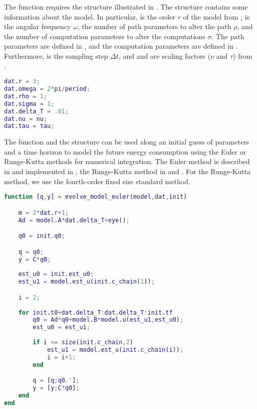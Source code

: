The function requires the structure  illustrated in . The structure contains some information about the model. In particular,  is the order $r$ of the model from ,  is the angular frequency $\omega$,  the number of path parameters to alter the path $\rho$, and  the number of computation parameters to alter the computations $\sigma$. The path parameters are defined in , and the computation parameters are defined in . Furthermore,  is the sampling step $\Delta t$, and  and  are scaling factors ($\nu$ and $\tau$) from .

\begin{lstlisting}[language=Matlab,caption={[Struct used to build the model]Struct \stt{dat} used by function \stt{build\_model} to build the model.},captionpos=b,label=lst:struct_dat]
dat.r = 3;
dat.omega = 2*pi/period;
dat.rho = 1;
dat.sigma = 1;
dat.delta_T = .01;
dat.nu = nu;
dat.tau = tau;
\end{lstlisting}

The function  and the structure  can be used along an initial guess of parameters and a time horizon to model the future energy consumption using the Euler or Runge-Kutta methods for numerical integration. The Euler method is described in  and implemented in , the Runge-Kutta method in  and . For the Runge-Kutta method, we use the fourth-order fixed size standard method. 

\begin{lstlisting}[language=Matlab,caption={[Euler method for numerical integration]Euler method for numerical integration of the model.},captionpos=b,label=lst:euler]
function [q,y] = evolve_model_euler(model,dat,init)

    m = 2*dat.r+1;
    Ad = model.A*dat.delta_T+eye();

    q0 = init.q0;

    q = q0;
    y = C*q0;
    
    est_u0 = init.est_u0;
    est_u1 = model.est_u(init.c_chain(1));

    i = 2;
    
    for init.t0+dat.delta_T:dat.delta_T:init.tf
        q0 = Ad*q0+model.B*model.u(est_u1,est_u0);
        est_u0 = est_u1;
        
        if i <= size(init.c_chain,2)
            est_u1 = model.est_u(init.c_chain(i));
            i = i+1;
        end

        q = [q;q0.'];
        y = [y;C*q0];
    end
end
\end{lstlisting}

